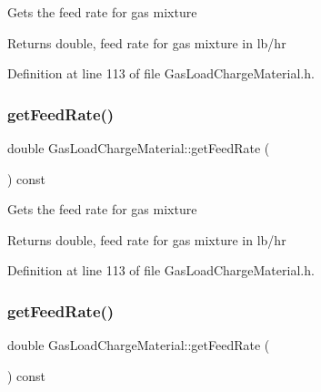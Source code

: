 Gets the feed rate for gas mixture

\begin{DoxyReturn}{Returns}
double, feed rate for gas mixture in lb/hr 
\end{DoxyReturn}


Definition at line 113 of file Gas\+Load\+Charge\+Material.\+h.

\mbox{\label{class_gas_load_charge_material_ae14ebe9b7091a491166174968505b6ee}} 
\subsubsection{\texorpdfstring{get\+Feed\+Rate()}{getFeedRate()}\hspace{0.1cm}{\footnotesize\ttfamily [2/3]}}
{\footnotesize\ttfamily double Gas\+Load\+Charge\+Material\+::get\+Feed\+Rate (\begin{DoxyParamCaption}{ }\end{DoxyParamCaption}) const\hspace{0.3cm}{\ttfamily [inline]}}

Gets the feed rate for gas mixture

\begin{DoxyReturn}{Returns}
double, feed rate for gas mixture in lb/hr 
\end{DoxyReturn}


Definition at line 113 of file Gas\+Load\+Charge\+Material.\+h.

\mbox{\label{class_gas_load_charge_material_ae14ebe9b7091a491166174968505b6ee}} 
\subsubsection{\texorpdfstring{get\+Feed\+Rate()}{getFeedRate()}\hspace{0.1cm}{\footnotesize\ttfamily [3/3]}}
{\footnotesize\ttfamily double Gas\+Load\+Charge\+Material\+::get\+Feed\+Rate (\begin{DoxyParamCaption}{ }\end{DoxyParamCaption}) const\hspace{0.3cm}{\ttfamily [inline]}}

